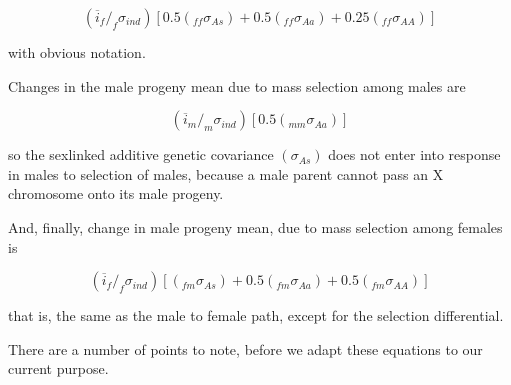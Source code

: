 \documentclass[titlepage]{article}  %
\begin{document}
\begin{equation}
(\overline{i}_{f}/_{f}\sigma_{ind})[0.5(_{ff}\sigma_{As}) + 0.5(_{ff}\sigma_{Aa}) + 0.25(_{ff}\sigma_{AA})]
\end{equation}

with obvious notation.

Changes in the male progeny mean due to mass selection among males are

\begin{equation}
(\overline{i}_{m}/_{m}\sigma_{ind})[0.5(_{mm}\sigma_{Aa})]
\end{equation}

so the sexlinked additive genetic covariance $(\sigma_{As})$ does not enter into response in males to selection of males, because a male parent cannot pass an X chromosome onto its male progeny.

And, finally, change in male progeny mean, due to mass selection among females is

\begin{equation}
(\overline{i}_{f}/_{f}\sigma_{ind})[(_{fm}\sigma_{As}) + 0.5(_{fm}\sigma_{Aa}) + 0.5(_{fm}\sigma_{AA})]
\end{equation}

that is, the same as the male to female path, except for the selection differential.

There are a number of points to note, before we adapt these equations to our current purpose.
\end{document}
